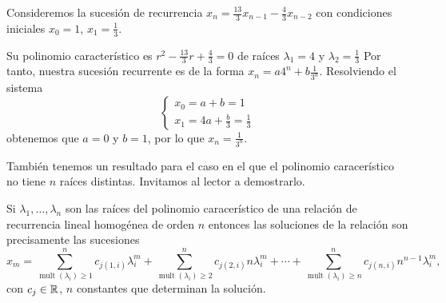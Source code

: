 \begin{example}
    Consideremos la sucesión de recurrencia
    $x_n = \frac{13}{3}x_{n-1} - \frac{4}{3}x_{n-2}$
    con condiciones iniciales $x_0 = 1$, $x_1 = \frac{1}{3}$.

    Su polinomio característico es $r^2-\frac{13}{3}r+\frac{4}{3} = 0$
    de raíces $\lambda_1 = 4$ y $\lambda_2 = \frac{1}{3}$
    Por tanto, nuestra sucesión recurrente es de la forma
    $x_n = a4^n + b\frac{1}{3^n}$.
    Resolviendo el sistema
    \begin{equation*}
        \left\{\begin{matrix}
        x_0 = a+b = 1 \\
        x_1 = 4a + \frac{b}{3} = \frac{1}{3}
        \end{matrix}\right.
    \end{equation*}
    obtenemos que $a = 0$ y $b = 1$,
    por lo que $x_n = \frac{1}{3^n}$.
\end{example}

También tenemos un resultado para el caso en el que
el polinomio caracerístico no tiene $n$ raíces distintas.
Invitamos al lector a demostrarlo.

\begin{proposition}
    \newcommand{\mult}[1]{\operatorname{mult}(#1)}

    Si $\lambda_1,\ldots,\lambda_n$ son las raíces
    del polinomio caracerístico de
    una relación de recurrencia lineal homogénea de orden $n$
    entonces las soluciones de la relación son precisamente las sucesiones
    \begin{equation*}
        x_m =
        \sum_{\mult{\lambda_i} \ge 1}^n c_{j(1, i)}\lambda_i^m +
        \sum_{\mult{\lambda_i} \ge 2}^n c_{j(2, i)}n\lambda_i^m +
        \cdots +
        \sum_{\mult{\lambda_i} \ge n}^n c_{j(n, i)}n^{n-1}\lambda_i^m,
    \end{equation*}
    con $c_j \in \mathbb{R}$, $n$ constantes que determinan la solución.
\end{proposition}

